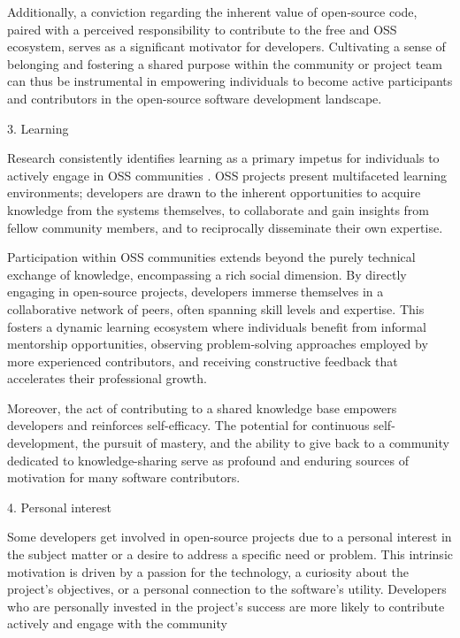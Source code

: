 Additionally,  a conviction regarding the inherent value of open-source code, paired with a perceived responsibility to contribute to the free and OSS ecosystem, serves as a significant motivator for developers. Cultivating a sense of belonging and fostering a shared purpose within the community or project team can thus be instrumental in empowering individuals to become active participants and contributors in the open-source software development landscape.



3. Learning

Research consistently identifies learning as a primary impetus for individuals to actively engage in OSS communities \parencite{06ye2003toward, 07zhao2024openrank, 08zhang2024paid, 09lakhani2005hackers, 10wu2007empirical, 11gerosa2021shifting, 12choi2015characteristics, 17alexander2002working, 18oreg2008exploring}. OSS projects present multifaceted learning environments; developers are drawn to the inherent opportunities to acquire knowledge from the systems themselves, to collaborate and gain insights from fellow community members, and to reciprocally disseminate their own expertise.

Participation within OSS communities extends beyond the purely technical exchange of knowledge, encompassing a rich social dimension. By directly engaging in open-source projects, developers immerse themselves in a collaborative network of peers, often spanning skill levels and expertise. This fosters a dynamic learning ecosystem where individuals benefit from informal mentorship opportunities, observing problem-solving approaches employed by more experienced contributors, and receiving constructive feedback that accelerates their professional growth.

Moreover, the act of contributing to a shared knowledge base empowers developers and reinforces self-efficacy. The potential for continuous self-development, the pursuit of mastery, and the ability to give back to a community dedicated to knowledge-sharing serve as profound and enduring sources of motivation for many software contributors.

4. Personal interest

Some developers get involved in open-source projects due to a personal interest in the subject matter or a desire to address a specific need or problem. This intrinsic motivation is driven by a passion for the technology, a curiosity about the project's objectives, or a personal connection to the software's utility. Developers who are personally invested in the project's success are more likely to contribute actively and engage with the community \citep{06ye2003toward,07zhao2024openrank,09lakhani2005hackers,11gerosa2021shifting,12choi2015characteristics,13li2012leadership,16ke2008motivations,17alexander2002working}

